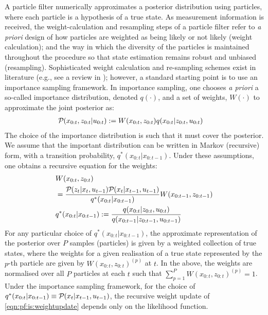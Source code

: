A particle filter numerically approximates a posterior distribution using particles, where each particle is a hypothesis of a true state. As measurement information is received, the weight-calculation and resampling steps of a particle filter refer to \textit{a priori} design of how particles are weighted as being likely or not likely (weight calculation); and the way in which the diversity of the particles is maintained throughout the procedure so that state estimation remains robust and unbiased (resampling). Sophisticated weight calculation and re-sampling schemes exist in literature (e.g., see a review in \cite{li2015resampling}); however, a standard starting point is to use an importance sampling framework. In importance sampling, one chooses \textit{a priori} a so-called importance distribution, denoted $q(\cdot)$, and a set of weights, $W(\cdot)$ to approximate the joint posterior as:
\begin{align}
\mathcal{P}_{} ( x_{0:t} , z_{0:t} |u_{0:t} ) &:= W(x_{0:t} , z_{0:t}) q(x_{0:t} | z_{0:t}, u_{0:t}) \label{eqn:pf:is:weightupdate}
\end{align} The choice of the importance distribution is such that it must cover the posterior. We assume that the important distribution can be written in Markov (recursive) form, with a transition probability, $q^*(x_{0:t} |x_{0:t-1})$. Under these assumptions, one obtains a recursive equation for the weights:
\begin{align}
& W(x_{0:t} , z_{0:t})  \nonumber \\
&= \frac{\mathcal{P}_{} ( z_{t} | x_{t}, u_{t-1} )  \mathcal{P}_{} ( x_{t}| x_{t-1}, u_{t-1}  )}{q^*(x_{0:t} |x_{0:t-1})} W(x_{0:t-1} , z_{0:t-1}) \\
&q^*(x_{0:t} |x_{0:t-1}) := \frac{q(x_{0:t} | z_{0:t}, u_{0:t})}{q(x_{0:t-1} | z_{0:t-1}, u_{0:t-1})}
\end{align} For any particular choice of $q^*(x_{0:t} |x_{0:t-1})$, the approximate representation of the posterior over $P$ samples  (particles) is given by a weighted collection of true states, where the weights for a given realisation of a true state represented by the $p$-th particle are given by  $W(x_{0:t} , z_{0:t})^{(p)}$ at $t$.  In the above, the weights are normalised over all $P$ particles at each $t$ such that $\sum_{p = 1}^{P} W(x_{0:t} , z_{0:t})^{(p)} = 1$. Under the importance sampling framework, for the choice of $q^*(x_{0:t} |x_{0:t-1}) \equiv \mathcal{P}_{} ( x_{t}| x_{t-1}, u_{t-1} )$, the recursive weight update of \cref{eqn:pf:is:weightupdate} depends only on the likelihood function.\\
